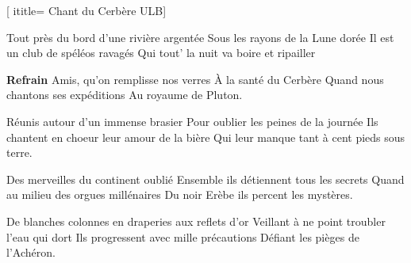 [
ititle= {Chant du Cerbère ULB}]

\beginverse
Tout près du bord d'une rivière argentée
Sous les rayons de la Lune dorée
Il est un club de spéléos ravagés
Qui tout' la nuit va boire et ripailler
\endverse

\beginchorus
\textbf {Refrain}
Amis, qu'on remplisse nos verres
À la santé du Cerbère
Quand nous chantons ses expéditions
Au royaume de Pluton.
\endchorus

\beginverse
Réunis autour d'un immense brasier
Pour oublier les peines de la journée
Ils chantent en choeur leur amour de la bière
Qui leur manque tant à cent pieds sous terre.
\endverse

\beginverse
Des merveilles du continent oublié
Ensemble ils détiennent tous les secrets
Quand au milieu des orgues millénaires
Du noir Erèbe ils percent les mystères.
\endverse

\beginverse
De blanches colonnes en draperies aux reflets d'or
Veillant à ne point troubler l'eau qui dort
Ils progressent avec mille précautions
Défiant les pièges de l'Achéron.
\endverse

\endsong

